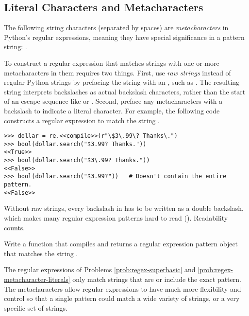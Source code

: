 \subsection*{Literal Characters and Metacharacters} %

The following string characters (separated by spaces) are \emph{metacharacters} in Python's regular expressions, meaning they have special significance in a pattern string:
.

To construct a regular expression that matches strings with one or more metacharacters in them requires two things.
First, use \emph{raw strings} instead of regular Python strings by prefacing the string with an , such as .
The resulting string interprets backslashes as actual backslash characters, rather than the start of an escape sequence like \li{\\n} or \li{\\t}.
Second, preface any metacharacters with a backslash to indicate a literal character.
For example, the following code constructs a regular expression to match the string .

\begin{lstlisting}
>>> dollar = re.<<compile>>(r"\$3\.99\? Thanks\.")
>>> bool(dollar.search("$3.99? Thanks."))
<<True>>
>>> bool(dollar.search("$3\.99? Thanks."))
<<False>>
>>> bool(dollar.search("$3.99?"))   # Doesn't contain the entire pattern.
<<False>>
\end{lstlisting}

Without raw strings, every backslash in has to be written as a double backslash, which makes many regular expression patterns hard to read ().
Readability counts.

\begin{problem}
Write a function that compiles and returns a regular expression pattern object that matches the string .
\label{prob:regex-metacharacter-literals}
\end{problem}

The regular expressions of Problems \ref{prob:regex-superbasic} and \ref{prob:regex-metacharacter-literals} only match strings that are or include the exact pattern.
The metacharacters allow regular expressions to have much more flexibility and control so that a single pattern could match a wide variety of strings, or a very specific set of strings.

